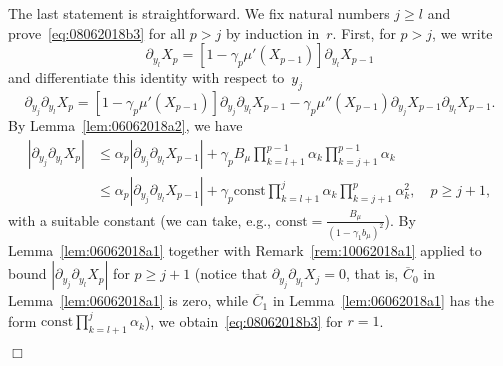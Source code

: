 \documentclass[aap,preprint]{imsart}
\newcommand{\proofendsign}{$\Box$}
\newenvironment{proof}{{\noindent \bf Proof }}
 {{\hspace*{\fill}\proofendsign\par\bigskip}}
\newcommand*{\const}{\mathrm{const}}
\newcommand*{\ol}{\overline}
\begin{document}
\begin{proof}
The last statement is straightforward.
We fix natural numbers $j\ge l$ and prove~\eqref{eq:08062018b3}
for all $p>j$ by induction in~$r$.
First, for $p>j$, we write
$$
\partial_{y_{l}}X_{p}
=\left[1-\gamma_{p}\mu'(X_{p-1})\right]\partial_{y_{l}}X_{p-1}
$$
and differentiate this identity with respect to~$y_j$
$$
\partial_{y_{j}}\partial_{y_{l}}X_{p}
=\left[1-\gamma_{p}\mu'(X_{p-1})\right]\partial_{y_{j}}\partial_{y_{l}}X_{p-1}-\gamma_{p}\mu''(X_{p-1})\partial_{y_{j}}X_{p-1}\partial_{y_{l}}X_{p-1}.
$$
By Lemma~\ref{lem:06062018a2}, we have
\begin{align*}
|\partial_{y_{j}}\partial_{y_{l}}X_{p}|
&\le\alpha_p|\partial_{y_{j}}\partial_{y_{l}}X_{p-1}|
+\gamma_{p}
B_\mu
\prod_{k=l+1}^{p-1}\alpha_k
\prod_{k=j+1}^{p-1}\alpha_k\\
&\le\alpha_p|\partial_{y_{j}}\partial_{y_{l}}X_{p-1}|
+\gamma_{p}
\const
\prod_{k=l+1}^{j}\alpha_k
\prod_{k=j+1}^{p}\alpha_k^2,
\quad p\ge j+1,
\end{align*}
with a suitable constant
(we can take, e.g., $\const=\frac{B_\mu}{(1-\gamma_1 b_\mu)^2}$).
By Lemma~\ref{lem:06062018a1}
together with Remark~\ref{rem:10062018a1} applied
to bound $|\partial_{y_{j}}\partial_{y_{l}}X_{p}|$
for $p\ge j+1$
(notice that $\partial_{y_j}\partial_{y_l}X_j=0$, that is,
$\ol C_0$ in Lemma~\ref{lem:06062018a1} is zero,
while $\ol C_1$ in Lemma~\ref{lem:06062018a1}
has the form $\const\prod_{k=l+1}^j \alpha_k$),
we obtain~\eqref{eq:08062018b3} for $r=1$.


\end{proof}
\end{document}
